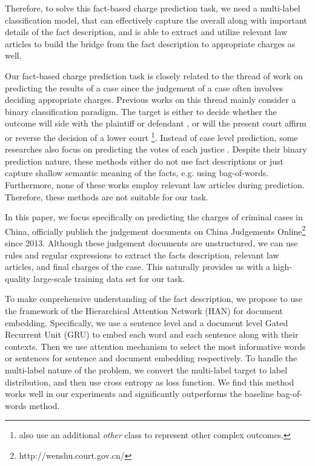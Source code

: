 Therefore, to solve this fact-based charge prediction task, we need a multi-label classification model, that can effectively capture the overall  along with important details of the fact description, and is able to extract and utilize relevant law articles to build the bridge from the fact description to appropriate charges as well. 

Our fact-based charge prediction task is closely related to the thread of work on predicting the results of a case since the judgement of a case often involves deciding appropriate charges. Previous works on this thread mainly consider a binary classification paradigm. The target is either to decide whether the outcome will side with the plaintiff or defendant \cite{aletras2016predicting}, or will the present court affirm or reverse the decision of a lower court \cite{katz2016general} \footnote{\cite{katz2016general} also use an additional \emph{other} class to represent other complex outcomes.}. Instead of case level prediction, some researches also focus on predicting the votes of each justice \cite{martin2002dynamic,lauderdale2014scaling,sim2015utility}. Despite their binary prediction nature, these methods either do not use fact descriptions or just capture shallow semantic meaning of the facts, e.g. using bag-of-words. Furthermore, none of these works employ relevant law articles during prediction. Therefore, these methods are not suitable for our task. 

In this paper, we focus specifically on predicting the charges of criminal cases in China,  officially publish the judgement documents on China Judgements Online\footnote{http://wenshu.court.gov.cn/} since 2013. Although these judgement documents are unstructured, we can use rules and regular expressions to extract the facts description, relevant law articles, and final charges of the case. This naturally provides us with a high-quality large-scale training data set for our task.

To make conprehensive understanding of the fact description, we propose to use the framework of the Hierarchical Attention Network (HAN) \cite{yang2016hierarchical} for document embedding. Specifically, we use a sentence level and a document level Gated Recurrent Unit (GRU) to embed each word and each sentence along with their contexts. Then we use attention mechanism to select the most informative words or sentences for sentence and document embedding respectively. To handle the multi-label nature of the problem, we convert the multi-label target to label distribution, and then use cross entropy as loss function. We find this method works well in our experiments and significantly outperforms the baseline bag-of-words method.

